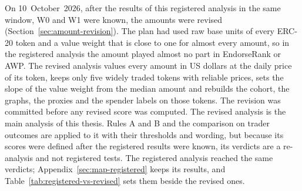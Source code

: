 On 10~October~2026, after the results of this registered analysis in the same window, W0 and W1 were known, the amounts were revised (Section~\ref{sec:amount-revision}). The plan had used raw base units of every ERC-20 token and a value weight that is close to one for almost every amount, so in the registered analysis the amount played almost no part in EndorseRank or AWP. The revised analysis values every amount in US dollars at the daily price of its token, keeps only five widely traded tokens with reliable prices, sets the slope of the value weight from the median amount and rebuilds the cohort, the graphs, the proxies and the spender labels on those tokens. The revision was committed before any revised score was computed. The revised analysis is the main analysis of this thesis. Rules A and B and the comparison on trader outcomes are applied to it with their thresholds and wording, but because its scores were defined after the registered results were known, its verdicts are a re-analysis and not registered tests. The registered analysis reached the same verdicts; Appendix~\ref{sec:map-registered} keeps its results, and Table~\ref{tab:registered-vs-revised} sets them beside the revised ones.

